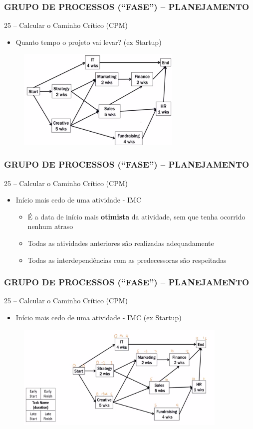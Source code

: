 \begin{frame}
 \frametitle{GRUPO DE PROCESSOS (“FASE”) – PLANEJAMENTO}
25 – Calcular o Caminho Crítico (CPM)
 \begin{itemize}
  \item Quanto tempo o projeto vai levar? (ex Startup)
 \end{itemize}
  \begin{figure}
   \centering
   \includegraphics[width = 0.7\textwidth]{figs/fig25.png}
  \end{figure}
\end{frame}

\begin{frame}
 \frametitle{GRUPO DE PROCESSOS (“FASE”) – PLANEJAMENTO}
25 – Calcular o Caminho Crítico (CPM)
  \begin{itemize}
   \item Início mais cedo de uma atividade - IMC
   \begin{itemize}
    \item É a data de início mais \textbf{otimista} da atividade, sem que tenha ocorrido nenhum atraso
    \item Todas as atividades anteriores são realizadas adequadamente
    \item Todas as interdependências  com as predecessoras são respeitadas
   \end{itemize}
  \end{itemize}
\end{frame}

\begin{frame}
 \frametitle{GRUPO DE PROCESSOS (“FASE”) – PLANEJAMENTO}
25 – Calcular o Caminho Crítico (CPM)
 \begin{itemize}
  \item  Início mais cedo de uma atividade - IMC (ex Startup)
 \end{itemize}
  \begin{figure}
   \centering
   \includegraphics[width = 0.9\textwidth]{figs/fig26.png}
  \end{figure}
\end{frame}

